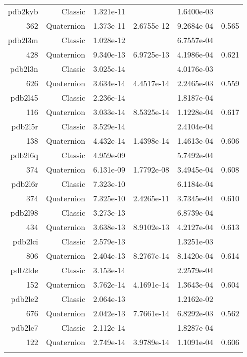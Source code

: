 \begin{xltabular}{\textwidth}{r|rS[table-format=1.3e+2]S[table-format=1.4e+2]S[table-format=1.4e+2]S[table-format=-1.3]}
pdb2kyb & Classic & 1.321e-11 &  & 1.6400e-03 & \\
362 & Quaternion & 1.373e-11 & 2.6755e-12 & 9.2684e-04 & 0.565\\  \addlinespace
pdb2l3m & Classic & 1.028e-12 &  & 6.7557e-04 & \\
428 & Quaternion & 9.340e-13 & 6.9725e-13 & 4.1986e-04 & 0.621\\  \addlinespace
{\color{red} pdb2l3n } & Classic & 3.025e-14 &  & 4.0176e-03 & \\
626 & Quaternion & 3.634e-14 & 4.4517e-14 & 2.2465e-03 & 0.559\\  \addlinespace
pdb2l45 & Classic & 2.236e-14 &  & 1.8187e-04 & \\
116 & Quaternion & 3.033e-14 & 8.5325e-14 & 1.1228e-04 & 0.617\\  \addlinespace
pdb2l5r & Classic & 3.529e-14 &  & 2.4104e-04 & \\
138 & Quaternion & 4.432e-14 & 1.4398e-14 & 1.4613e-04 & 0.606\\  \addlinespace
pdb2l6q & Classic & 4.959e-09 &  & 5.7492e-04 & \\
374 & Quaternion & 6.131e-09 & 1.7792e-08 & 3.4945e-04 & 0.608\\  \addlinespace
pdb2l6r & Classic & 7.323e-10 &  & 6.1184e-04 & \\
374 & Quaternion & 7.325e-10 & 2.4265e-11 & 3.7345e-04 & 0.610\\  \addlinespace
pdb2l98 & Classic & 3.273e-13 &  & 6.8739e-04 & \\
434 & Quaternion & 3.638e-13 & 8.9102e-13 & 4.2127e-04 & 0.613\\  \addlinespace
pdb2lci & Classic & 2.579e-13 &  & 1.3251e-03 & \\
806 & Quaternion & 2.404e-13 & 8.2767e-14 & 8.1420e-04 & 0.614\\  \addlinespace
pdb2lde & Classic & 3.153e-14 &  & 2.2579e-04 & \\
152 & Quaternion & 3.762e-14 & 4.1691e-14 & 1.3643e-04 & 0.604\\  \addlinespace
{\color{red} pdb2le2 } & Classic & 2.064e-13 &  & 1.2162e-02 & \\
676 & Quaternion & 2.042e-13 & 7.7661e-14 & 6.8292e-03 & 0.562\\  \addlinespace
pdb2le7 & Classic & 2.112e-14 &  & 1.8287e-04 & \\
122 & Quaternion & 2.749e-14 & 3.9789e-14 & 1.1091e-04 & 0.606\\  \addlinespace

\end{xltabular}

